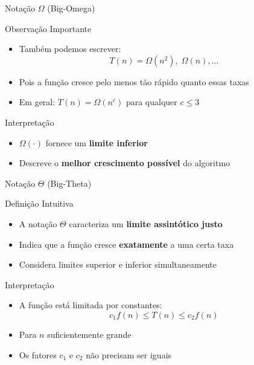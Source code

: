 \documentclass{beamer}
\begin{document}
\begin{frame}{Notação $\Omega$ (Big-Omega)}

\begin{block}{Observação Importante}
\begin{itemize}
    \item Também podemos escrever:
    \[
    T(n) = \Omega(n^2),\; \Omega(n), \dots
    \]
    \item Pois a função cresce pelo menos tão rápido quanto essas taxas
    \item Em geral: $T(n) = \Omega(n^c)$ para qualquer $c \leq 3$
\end{itemize}
\end{block}

\vspace{0.2cm}

\begin{alertblock}{Interpretação}
\begin{itemize}
    \item $\Omega(\cdot)$ fornece um \textbf{limite inferior}
    \item Descreve o \textbf{melhor crescimento possível} do algoritmo
\end{itemize}
\end{alertblock}

\end{frame}
\begin{frame}{Notação $\Theta$ (Big-Theta)}

\begin{block}{Definição Intuitiva}
\begin{itemize}
    \item A notação $\Theta$ caracteriza um \textbf{limite assintótico justo}
    \item Indica que a função cresce \textbf{exatamente} a uma certa taxa
    \item Considera limites superior e inferior simultaneamente
\end{itemize}
\end{block}

\vspace{0.2cm}

\begin{block}{Interpretação}
\begin{itemize}
    \item A função está limitada por constantes:
    \[
    c_1 f(n) \leq T(n) \leq c_2 f(n)
    \]
    \item Para $n$ suficientemente grande
    \item Os fatores $c_1$ e $c_2$ não precisam ser iguais
\end{itemize}
\end{block}

\end{frame}
\end{document}
